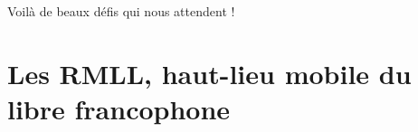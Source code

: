 \documentclass{FramateX}
\begin{document}
\begin{refsection}
Voilà de beaux défis qui nous attendent !

























\printbibliography[heading=subbibliography]
\end{refsection}




\chapter*{Les RMLL, haut-lieu mobile du libre francophone} 
{}
\end{document}
